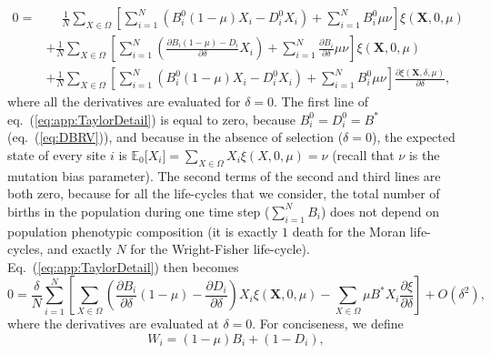 \documentclass[11pt, letterpaper]{article}
\renewcommand{\eqref}[1]{\textup{{\normalfont eq.~(\ref{#1}}\normalfont)}}
\newcommand{\Eqref}[1]{Eq.~(\ref{#1})}
\newcommand{\derivn}[2]{\frac{\partial #1}{\partial #2}}
\newcommand{\Espzero}[1]{\mathbb{E}_0\big[ #1\big]}%
\newcommand{\bigO}[1]{O\left( #1 \right)}
\newcommand{\mutbias}{\nu}
\newcommand{\selstr}{\delta}
\begin{document}
\begin{equation}\label{eq:app:TaylorDetail}
\begin{aligned}
0 = & \phantom{+} \frac{1}{N} \sum_{X\in \Omega} \left[ \sum_{i=1}^N \left( B_i^0 (1-\mu) X_i - D_i^0 X_i \right) + \sum_{i=1}^N B_i^0 \mu \mutbias \right] \xi(\mathbf{X}, 0, \mu) \\
%
& + \frac{1}{N} \sum_{X\in \Omega} \left[ \sum_{i=1}^N \left( \frac{\partial B_i (1-\mu) - D_i}{\partial \selstr} X_i  \right) + \sum_{i=1}^N \frac{\partial B_i}{\partial \selstr} \mu \mutbias \right] \xi(\mathbf{X}, 0, \mu) \\
% 
& + \frac{1}{N} \sum_{X\in \Omega} \left[ \sum_{i=1}^N \left( B_i^0 (1-\mu) X_i - D_i^0 X_i \right) + \sum_{i=1}^N B_i^0 \mu \mutbias \right] \frac{\partial \xi(\mathbf{X}, \selstr, \mu)}{\partial \selstr},
\end{aligned}
\end{equation}
where all the derivatives are evaluated for $\selstr = 0$. The first line of \eqref{eq:app:TaylorDetail} is equal to zero, because $B_i^0 = D_i^0 = B^*$ (\eqref{eq:DBRV}), and because in the absence of selection ($\selstr =0$), the expected state of every site $i$ is $\Espzero{X_i} = \sum_{X\in \Omega} X_i \xi(X, 0, \mu)= \mutbias$ (recall that $\mutbias$ is the mutation bias parameter). The second terms of the second and third lines are both zero, because for all the life-cycles that we consider, the total number of births in the population during one time step ($\sum_{i=1}^N B_i$) does not depend on population phenotypic composition (it is exactly $1$ death for the Moran life-cycles, and exactly $N$ for the Wright-Fisher life-cycle). \Eqref{eq:app:TaylorDetail} then becomes
%
\begin{equation}\label{eq:weaksel0}
0 = \frac{\selstr}{N} \sum_{i=1}^N \left[ \sum_{X\in \Omega} \left( \derivn{B_i}{\selstr} (1-\mu) - \derivn{D_i}{\selstr} \right) X_i  \xi(\mathbf{X}, 0, \mu) - \sum_{X\in \Omega} \mu B^* X_i  \derivn{\xi}{\selstr}\right]  + \bigO{\selstr^2},
\end{equation}
%
where the derivatives are evaluated at $\selstr = 0$. For conciseness, we define 
%
\begin{equation}\label{eq:app:defW}
W_i = (1-\mu) B_i + (1-D_i), 
\end{equation}
\end{document}
